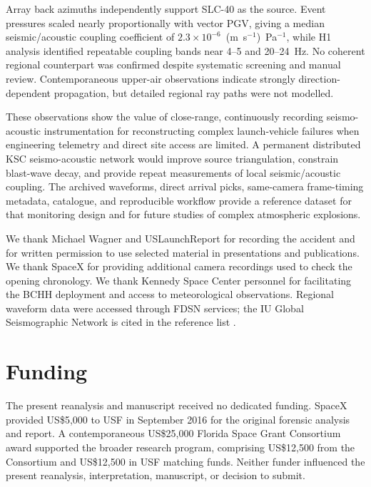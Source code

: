 \documentclass[]{seismica}
\begin{document}
Array back azimuths independently support SLC-40 as the source. Event
pressures scaled nearly proportionally with vector PGV, giving a median
seismic/acoustic coupling coefficient of
$2.3\times10^{-6}$~(m~s$^{-1}$)~Pa$^{-1}$, while H1 analysis identified
repeatable coupling bands near 4--5 and 20--24~Hz. No coherent regional
counterpart was confirmed despite systematic screening and manual review.
Contemporaneous upper-air observations indicate strongly direction-dependent
propagation, but detailed regional ray paths were not modelled.

These observations show the value of close-range, continuously recording
seismo-acoustic instrumentation for reconstructing complex launch-vehicle
failures when engineering telemetry and direct site access are limited. A
permanent distributed KSC seismo-acoustic network would improve source
triangulation, constrain blast-wave decay, and provide repeat measurements of
local seismic/acoustic coupling. The archived waveforms, direct arrival picks,
same-camera frame-timing metadata, catalogue, and reproducible workflow provide
a reference dataset for that monitoring design and for future studies of
complex atmospheric explosions.

\begin{acknowledgements}
We thank Michael Wagner and USLaunchReport for recording the accident and for
written permission to use selected material in presentations and publications.
We thank SpaceX for providing additional camera recordings used to check the
opening chronology.
We thank Kennedy Space Center personnel for facilitating the BCHH deployment
and access to meteorological observations. Regional waveform data were
accessed through FDSN services; the IU Global Seismographic Network is cited
in the reference list \citep{asl_gsn_iu_1988}.
\end{acknowledgements}


\section*{Funding}

The present reanalysis and manuscript received no dedicated funding. SpaceX
provided US\$5,000 to USF in September 2016 for the original forensic analysis
and report. A contemporaneous US\$25,000 Florida Space Grant Consortium award
supported the broader research program, comprising US\$12,500 from the
Consortium and US\$12,500 in USF matching funds. Neither funder influenced the
present reanalysis, interpretation, manuscript, or decision to submit.
\end{document}
